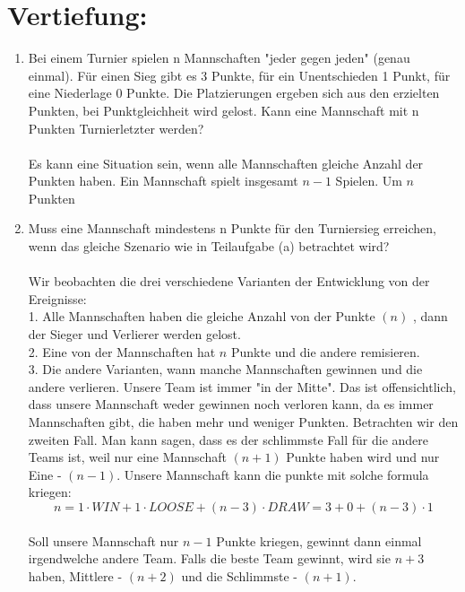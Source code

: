 


\DeclareMathOperator{\ggT}{ggT}
\DeclareMathOperator{\kgV}{kgV}


    \maketitle
    \section*{Vertiefung:}
    \begin{enumerate}[label=(\alph*)]
        \item Bei einem Turnier spielen n Mannschaften "jeder gegen jeden" (genau einmal). Für einen
		Sieg gibt es 3 Punkte, für ein Unentschieden 1 Punkt, für eine Niederlage 0 Punkte. Die
		Platzierungen ergeben sich aus den erzielten Punkten, bei Punktgleichheit wird gelost.
		Kann eine Mannschaft mit n Punkten Turnierletzter werden? \\\\
		Es kann eine Situation sein, wenn alle Mannschaften gleiche Anzahl der Punkten haben. 
		Ein Mannschaft spielt insgesamt $n-1$ Spielen. Um $n$ Punkten 
		
        \item Muss eine Mannschaft mindestens n Punkte für den Turniersieg erreichen, wenn das
		gleiche Szenario wie in Teilaufgabe (a) betrachtet wird? \\ \\
         Wir beobachten die drei verschiedene Varianten der Entwicklung von der Ereignisse: \\
        1. Alle Mannschaften haben die gleiche Anzahl von der Punkte $(n)$ , dann der Sieger und Verlierer werden gelost. \\
        2. Eine von der Mannschaften hat $n$ Punkte und die andere remisieren. \\
        3. Die andere Varianten, wann manche Mannschaften gewinnen und die andere verlieren. Unsere Team ist immer "in der Mitte". Das ist offensichtlich, dass unsere Mannschaft weder gewinnen noch verloren kann, da es immer Mannschaften gibt, die haben mehr und weniger Punkten.
        	Betrachten wir den zweiten Fall. Man kann sagen, dass es der schlimmste Fall für die andere Teams ist, weil nur eine Mannschaft  $(n+1)$ Punkte haben wird und nur Eine - $(n-1)$. Unsere Mannschaft kann die punkte mit solche formula kriegen:
        	$$n= 1 \cdot WIN + 1\cdot LOOSE + (n-3) \cdot DRAW = 3 + 0 + (n-3)\cdot 1 $$ \\
        	Soll unsere Mannschaft nur $n-1$ Punkte kriegen, gewinnt dann einmal irgendwelche andere Team. Falls die beste Team gewinnt, wird sie $n+3$ haben, Mittlere - $(n+2)$ und die Schlimmste - $(n+1)$.
        

\end{enumerate}
